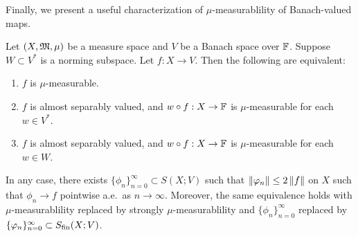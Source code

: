 \documentclass[a4paper]{article}
\renewcommand{\seqinfn}[1]{\{ #1 \}_{n=0}^\infty}
\begin{document}
Finally, we present a useful characterization of $\mu$-measurablility of
Banach-valued maps.

\begin{thm}[Pettis]
  Let $(X, \mathfrak{M}, \mu)$ be a measure space and $V$ be a
  Banach space over $\mathbb{F}$. Suppose $W \subset V^*$ is a
  norming subspace. Let $f: X \to V$. Then the following
  are equivalent:
  \begin{enumerate}
    \item $f$ is $\mu$-measurable.
    \item $f$ is almost separably valued, and $w \circ
            f : X \to \mathbb{F}$ is $\mu$-measurable for each $w \in V^*$.
    \item $f$ is almost separably valued, and $w \circ f:
            X \to \mathbb{F}$ is $\mu$-measurable for each $w \in W$.
  \end{enumerate}
  In any case, there exists $\seqinfn{\phi_n} \subset S(X; V)
  $ such that $\left\lVert \varphi_n\right\rVert \leq 2 \left\lVert f\right\rVert$ on $X$ such that
  $\phi_n \to f$ pointwise a.e.\ as $n \to \infty$.
  Moreover, the same
  equivalence holds with $\mu$-measurablility replaced by
  strongly $\mu$-measurablility and $\seqinfn{\phi_n}$
  replaced by $\seqinfn{\phi_n} \subset \Sfin(X; V)$.
\end{thm}
\end{document}
